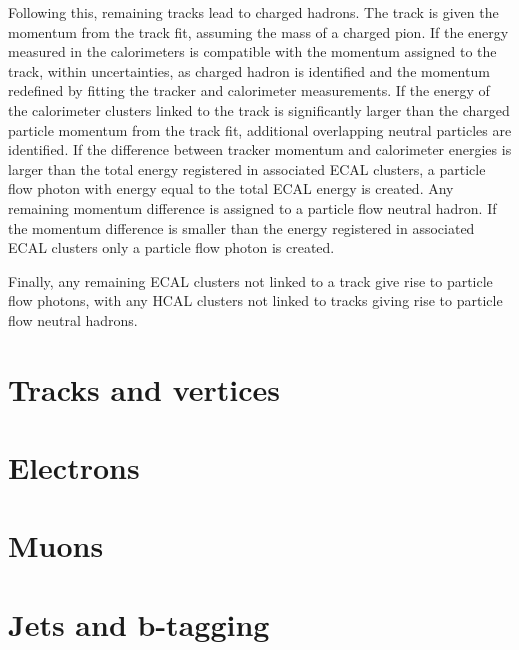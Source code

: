 Following this, remaining tracks lead to charged hadrons. The track is
given the momentum from the track fit, assuming the mass of a charged pion. If
the energy measured in the calorimeters is compatible with the momentum assigned
to the track, within uncertainties, as charged hadron is identified and the
momentum redefined by fitting the tracker and calorimeter measurements. If
the energy of the calorimeter clusters linked to the track is significantly larger than the
charged particle momentum from the track fit, additional overlapping neutral particles
are identified. If the difference between tracker momentum and calorimeter
energies is larger than the total energy registered in associated \ac{ECAL} clusters,
a particle flow photon with energy equal to the total \ac{ECAL} energy is created.
Any remaining momentum difference is assigned to a particle flow neutral hadron. If the momentum
difference is smaller than the energy registered in associated \ac{ECAL} clusters 
only a particle flow photon is created. %

Finally, any remaining \ac{ECAL} clusters not linked to a track give
rise to particle flow photons, with any \ac{HCAL} clusters
not linked to tracks giving rise to particle flow neutral hadrons.

\section{Tracks and vertices}
\label{sec:objects_pv}

\section{Electrons}
\label{sec:objects_ele}

\section{Muons}
\label{sec:objects_muo}

\section{Jets and b-tagging}
\label{sec:objects_jets}

